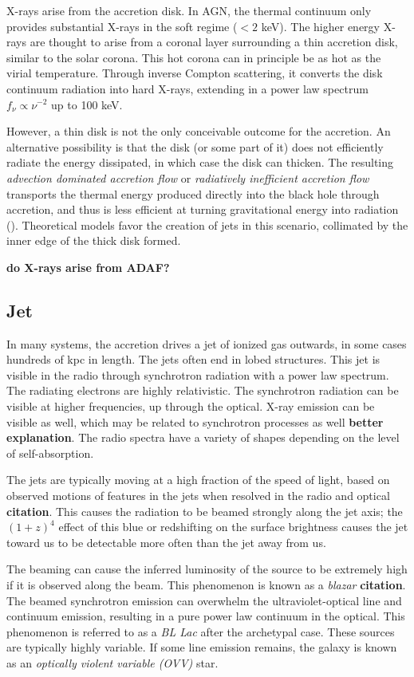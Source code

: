 X-rays arise from the accretion disk. In AGN, the thermal continuum
only provides substantial X-rays in the soft regime ($<2$ keV). The
higher energy X-rays are thought to arise from a coronal layer
surrounding a thin accretion disk, similar to the solar corona. This
hot corona can in principle be as hot as the virial
temperature. Through inverse Compton scattering, it converts the disk
continuum radiation into hard X-rays, extending in a power law
spectrum $f_\nu \propto \nu^{-2}$ up to 100 keV.

However, a thin disk is not the only conceivable outcome for the
accretion. An alternative possibility is that the disk (or some part
of it) does not efficiently radiate the energy dissipated, in which
case the disk can thicken. The resulting {\it advection dominated
accretion flow} or {\it radiatively inefficient accretion flow}
transports the thermal energy produced directly into the black hole
through accretion, and thus is less efficient at turning gravitational
energy into radiation (\citealt{narayan05a}). Theoretical models favor
the creation of jets in this scenario, collimated by the inner edge of
the thick disk formed.

{\bf do X-rays arise from ADAF?}

\subsection{Jet}

In many systems, the accretion drives a jet of ionized gas outwards,
in some cases hundreds of kpc in length.  The jets often end in lobed
structures.  This jet is visible in the radio through synchrotron
radiation with a power law spectrum. The radiating electrons are
highly relativistic. The synchrotron radiation can be visible at
higher frequencies, up through the optical. X-ray emission can be
visible as well, which may be related to synchrotron processes as well
{\bf better explanation}. The radio spectra have a variety of shapes
depending on the level of self-absorption.

The jets are typically moving at a high fraction of the speed of
light, based on observed motions of features in the jets when resolved
in the radio and optical {\bf citation}. This causes the radiation to
be beamed strongly along the jet axis; the $(1+z)^4$ effect of this
blue or redshifting on the surface brightness causes the jet toward us
to be detectable more often than the jet away from us.

The beaming can cause the inferred luminosity of the source to be
extremely high if it is observed along the beam. This phenomenon is
known as a {\it blazar} {\bf citation}. The beamed synchrotron
emission can overwhelm the ultraviolet-optical line and continuum
emission, resulting in a pure power law continuum in the optical. This
phenomenon is referred to as a {\it BL Lac} after the archetypal
case. These sources are typically highly variable. If some line
emission remains, the galaxy is known as an {\it optically violent
variable (OVV)} star.

